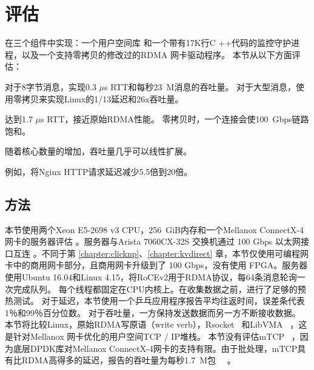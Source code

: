\section{评估}
\label{socksdirect:sec:evaluation}



\sys{} 在三个组件中实现：一个用户空间库 \libipc {} 和一个带有17K行C ++代码的监控守护进程，以及一个支持零拷贝的修改过的RDMA 网卡驱动程序。
本节从以下方面评估\sys{}：

对于8字节消息，\sys 实现0.3 $\mu$s RTT和每秒23~M消息的吞吐量。 对于大型消息，\sys 使用零拷贝来实现Linux的1/13延迟和26x吞吐量。

\sys 达到1.7 $\mu$s RTT，接近原始RDMA性能。
零拷贝时，一个连接会使100~Gbps链路饱和。



随着核心数量的增加，吞吐量几乎可以线性扩展。


例如，\sys  {}将Nginx HTTP请求延迟减少5.5倍到20倍。


\subsection{方法}
\label{socksdirect:subsec:methodology}

本节使用两个Xeon E5-2698 v3 CPU，256~GiB内存和一个Mellanox ConnectX-4网卡的服务器评估 \sys{}。服务器与Arista 7060CX-32S 交换机通过 100 Gbps 以太网接口互连 \cite {arista-7060cx}。不同于第 \ref{chapter:clicknp}、\ref{chapter:kvdirect} 章，本节仅使用可编程网卡中的商用网卡部分，且商用网卡升级到了 100 Gbps，没有使用 FPGA。服务器使用Ubuntu 16.04和Linux 4.15，将RoCEv2用于RDMA协议，每64条消息轮询一次完成队列。
每个线程都固定在CPU内核上。在收集数据之前，进行了足够的预热测试。
对于延迟，本节使用一个乒乓应用程序报告平均往返时间，误差条代表1％和99％百分位数。
对于吞吐量，一方保持发送数据而另一方不断接收数据。
本节将比较Linux，原始RDMA写原语（write verb），Rsocket~ \cite {rsockets}和LibVMA~ \cite {libvma}，这是针对Mellanox 网卡优化的用户空间TCP / IP堆栈。
本节没有评估mTCP~ \cite {jeong2014mtcp}，因为底层DPDK库对Mellanox ConnectX-4网卡的支持有限。由于批处理，mTCP具有比RDMA高得多的延迟，报告的吞吐量为每秒1.7~M包~~ \cite {kalia2018datacenter}。

